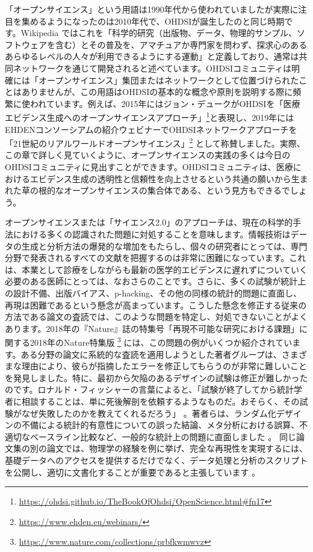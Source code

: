 \documentclass[
  11pt]{book}
\theoremstyle{definition}
\theoremstyle{definition}
\theoremstyle{definition}
\theoremstyle{definition}
\theoremstyle{remark}
\begin{document}
「オープンサイエンス」という用語は1990年代から使われていましたが実際に注目を集めるようになったのは2010年代で、OHDSIが誕生したのと同じ時期です。Wikipedia \citep{wiki:Open_science} ではこれを「科学的研究（出版物、データ、物理的サンプル、ソフトウェアを含む）とその普及を、アマチュアか専門家を問わず、探求心のあるあらゆるレベルの人々が利用できるようにする運動」と定義しており、通常は共同ネットワークを通じて開発されると述べています。OHDSIコミュニティは明確には「オープンサイエンス」集団またはネットワークとして位置づけられたことはありませんが、この用語はOHDSIの基本的な概念や原則を説明する際に頻繁に使われています。例えば、2015年にはジョン・デュークがOHDSIを「医療エビデンス生成へのオープンサイエンスアプローチ」\footnote{\url{https://ohdsi.github.io/TheBookOfOhdsi/OpenScience.html\#fn17}}と表現し、2019年にはEHDENコンソーシアムの紹介ウェビナーでOHDSIネットワークアプローチを「21世紀のリアルワールドオープンサイエンス」\footnote{\url{https://www.ehden.eu/webinars/}} として称賛しました。実際、この章で詳しく見ていくように、オープンサイエンスの実践の多くは今日のOHDSIコミュニティに見出すことができます。OHDSIコミュニティは、医療におけるエビデンス生成の透明性と信頼性を向上させるという共通の願いから生まれた草の根的なオープンサイエンスの集合体である、という見方もできるでしょう。

オープンサイエンスまたは「サイエンス2.0」のアプローチ\citep{wiki:Science_2.0}は、現在の科学的手法における多くの認識された問題に対処することを意味します。情報技術はデータの生成と分析方法の爆発的な増加をもたらし、個々の研究者にとっては、専門分野で発表されるすべての文献を把握するのは非常に困難になっています。これは、本業として診療をしながらも最新の医学的エビデンスに遅れずについていく必要のある医師にとっては、なおさらのことです。さらに、多くの試験が統計上の設計不備、出版バイアス、p-hacking、その他の同様の統計的問題に直面し、再現は困難であるという懸念が高まっています。こうした懸念を修正する従来の方法である論文の査読では、このような問題を特定し、対処できないことがよくあります。2018年の『Nature』誌の特集号「再現不可能な研究における課題」に関する2018年のNature特集版 \footnote{\url{https://www.nature.com/collections/prbfkwmwvz}} には、この問題の例がいくつか紹介されています。ある分野の論文に系統的な査読を適用しようとした著者グループは、さまざまな理由により、彼らが指摘したエラーを修正してもらうのが非常に難しいことを発見しました。特に、最初から欠陥のあるデザインの試験は修正が難しかったのです。ロナルド・フィッシャーの言葉によると、「試験が終了してから統計学者に相談することは、単に死後解剖を依頼するようなものだ。おそらく、その試験がなぜ失敗したのかを教えてくれるだろう」 \citep{wikiquote:Ronald_Fisher} 。著者らは、ランダム化デザインの不備による統計的有意性についての誤った結論、メタ分析における誤算、不適切なベースライン比較など、一般的な統計上の問題に直面しました \citep{allison_2016}。 同じ論文集の別の論文では、物理学の経験を例に挙げ、完全な再現性を実現するには、基礎データへのアクセスを提供するだけでなく、データ処理と分析のスクリプトを公開し、適切に文書化することが重要であると主張しています \citep{Chen2018} 。
\end{document}
